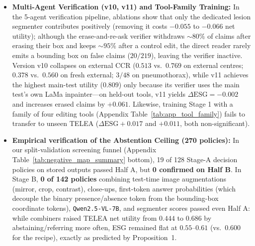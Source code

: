 \documentclass{article} %
\begin{document}
\begin{itemize}[leftmargin=*,nosep]
    \item \textbf{Multi-Agent Verification (v10, v11) and Tool-Family Training:} In the 5-agent verification pipeline, ablations show that only the dedicated lesion segmenter contributes positively (removing it costs $-0.055$ to $-0.066$ net utility); although the erase-and-re-ask verifier withdraws $\sim 80\%$ of claims after erasing their box and keeps $\sim 95\%$ after a control edit, the direct reader rarely emits a bounding box on false claims ($20/219$), leaving the verifier inactive. Version v10 collapses on external CCR ($0.513$ vs.\ $0.769$ on external centres; $0.378$ vs.\ $0.560$ on fresh external; $3/48$ on pneumothorax), while v11 achieves the highest main-test utility ($0.809$) only because its verifier uses the main test's own LaMa inpainter---on held-out tools, v11 yields $\Delta\text{ESG} = -0.002$ and increases erased claims by $+0.061$. Likewise, training Stage 1 with a family of four editing tools (Appendix Table~\ref{tab:app_tool_family}) fails to transfer to unseen TELEA ($\Delta\text{ESG} +0.017$ and $+0.011$, both non-significant).
    \item \textbf{Empirical verification of the Abstention Ceiling (270 policies):} In our split-validation screening funnel (Appendix Table~\ref{tab:negative_map_summary} bottom), 19 of 128 Stage-A decision policies on stored outputs passed Half A, but \textbf{0 confirmed on Half B}. In Stage B, \textbf{0 of 142 policies} combining test-time image augmentations (mirror, crop, contrast), close-ups, first-token answer probabilities (which decouple the binary presence/absence token from the bounding-box coordinate tokens), \texttt{Qwen2.5-VL-7B}, and segmenter scores passed even Half A: while combiners raised TELEA net utility from $0.444$ to $0.686$ by abstaining/referring more often, ESG remained flat at $0.55\text{--}0.61$ (vs.\ $0.600$ for the recipe), exactly as predicted by Proposition~1.
\end{itemize}
\end{document}

